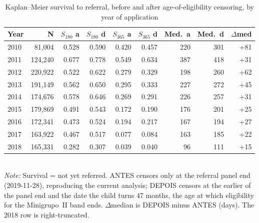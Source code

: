 \begin{table}[htbp]\centering
\caption{Kaplan--Meier survival to referral, before and after age-of-eligibility censoring, by year of application}
\label{tab:C1b}
\footnotesize
\setlength{\tabcolsep}{4pt}
\begin{tabular}{lrrrrrrrr}
\toprule
Year & N & $S_{180}$ a & $S_{180}$ d & $S_{365}$ a & $S_{365}$ d & Med.\ a & Med.\ d & $\Delta$med \\
\midrule
2010 & 81,004 & 0.528 & 0.590 & 0.420 & 0.457 & 220 & 301 & +81 \\
2011 & 124,240 & 0.677 & 0.778 & 0.549 & 0.634 & 387 & 418 & +31 \\
2012 & 220,922 & 0.522 & 0.622 & 0.279 & 0.329 & 198 & 260 & +62 \\
2013 & 191,149 & 0.562 & 0.650 & 0.295 & 0.333 & 227 & 272 & +45 \\
2014 & 174,676 & 0.578 & 0.646 & 0.269 & 0.291 & 226 & 257 & +31 \\
2015 & 179,869 & 0.491 & 0.543 & 0.172 & 0.190 & 176 & 201 & +25 \\
2016 & 172,341 & 0.473 & 0.524 & 0.194 & 0.217 & 167 & 194 & +27 \\
2017 & 163,922 & 0.467 & 0.517 & 0.077 & 0.084 & 163 & 185 & +22 \\
2018 & 165,331 & 0.282 & 0.307 & 0.039 & 0.040 & 96 & 111 & +15 \\
\bottomrule
\end{tabular}
\\[3pt]{\footnotesize \textit{Note:} Survival = not yet referred. ANTES censors only at the referral panel end (2019-11-28), reproducing the current analysis; DEPOIS censors at the earlier of the panel end and the date the child turns 47 months, the age at which eligibility for the Minigrupo~II band ends. $\Delta$median is DEPOIS minus ANTES (days). The 2018 row is right-truncated.}
\end{table}
